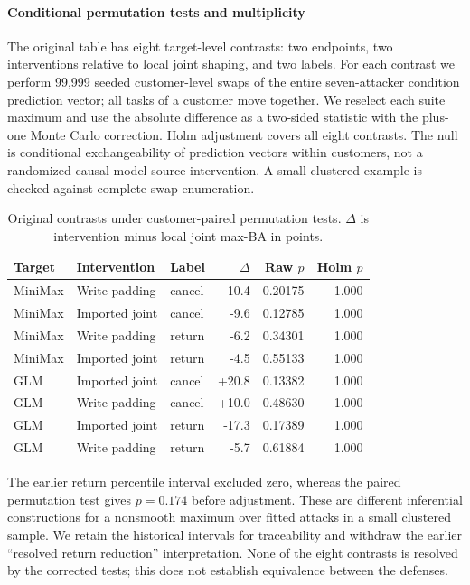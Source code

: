 \paragraph{Conditional permutation tests and multiplicity}
The original table has eight target-level contrasts: two endpoints, two interventions relative to local joint shaping, and two labels. For each contrast we perform 99,999 seeded customer-level swaps of the entire seven-attacker condition prediction vector; all tasks of a customer move together. We reselect each suite maximum and use the absolute difference as a two-sided statistic with the plus-one Monte Carlo correction. Holm adjustment covers all eight contrasts. The null is conditional exchangeability of prediction vectors within customers, not a randomized causal model-source intervention. A small clustered example is checked against complete swap enumeration.

\begin{table}[ht]\centering\small
\caption{Original contrasts under customer-paired permutation tests. $\Delta$ is intervention minus local joint max-BA in points.}\label{tab:r21-permutation}
\begin{tabular}{lllrrr}\toprule
Target & Intervention & Label & $\Delta$ & Raw $p$ & Holm $p$\\\midrule
MiniMax & Write padding & cancel & -10.4 & 0.20175 & 1.000 \\
MiniMax & Imported joint & cancel & -9.6 & 0.12785 & 1.000 \\
MiniMax & Write padding & return & -6.2 & 0.34301 & 1.000 \\
MiniMax & Imported joint & return & -4.5 & 0.55133 & 1.000 \\
GLM & Imported joint & cancel & +20.8 & 0.13382 & 1.000 \\
GLM & Write padding & cancel & +10.0 & 0.48630 & 1.000 \\
GLM & Imported joint & return & -17.3 & 0.17389 & 1.000 \\
GLM & Write padding & return & -5.7 & 0.61884 & 1.000 \\
\bottomrule\end{tabular}\end{table}
The earlier return percentile interval excluded zero, whereas the paired permutation test gives $p=0.174$ before adjustment. These are different inferential constructions for a nonsmooth maximum over fitted attacks in a small clustered sample. We retain the historical intervals for traceability and withdraw the earlier ``resolved return reduction'' interpretation. None of the eight contrasts is resolved by the corrected tests; this does not establish equivalence between the defenses.

